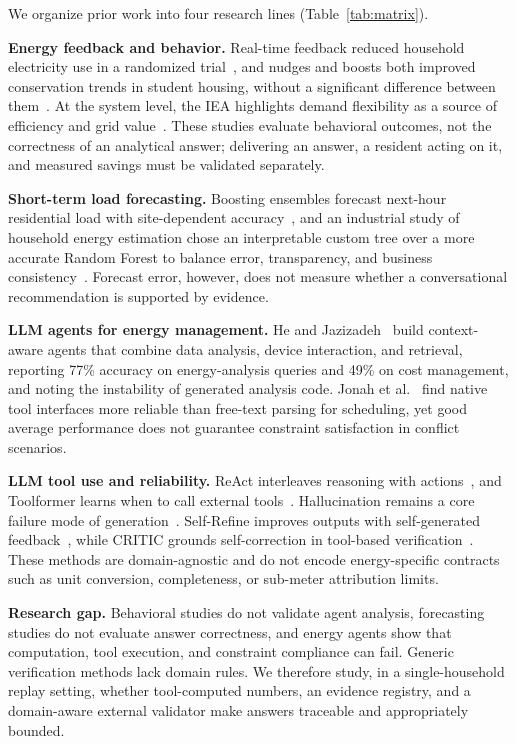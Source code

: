 \documentclass[conference]{IEEEtran}
\begin{document}
We organize prior work into four research lines (Table~\ref{tab:matrix}).

\textbf{Energy feedback and behavior.} Real-time feedback reduced
household electricity use in a randomized trial~\cite{boomsma2025feedback},
and nudges and boosts both improved conservation trends in student
housing, without a significant difference between
them~\cite{paunov2026nudges}. At the system level, the IEA highlights
demand flexibility as a source of efficiency and grid
value~\cite{iea2025flexibility}. These studies evaluate behavioral
outcomes, not the correctness of an analytical answer; delivering an
answer, a resident acting on it, and measured savings must be validated
separately.

\textbf{Short-term load forecasting.} Boosting ensembles forecast
next-hour residential load with site-dependent
accuracy~\cite{muqtadir2025nowcasting}, and an industrial study of
household energy estimation chose an interpretable custom tree over a
more accurate Random Forest to balance error, transparency, and
business consistency~\cite{beraud2024explainable}. Forecast error,
however, does not measure whether a conversational recommendation is
supported by evidence.

\textbf{LLM agents for energy management.} He and
Jazizadeh~\cite{he2025contextaware} build context-aware agents that
combine data analysis, device interaction, and retrieval, reporting
77\% accuracy on energy-analysis queries and 49\% on cost management,
and noting the instability of generated analysis code. Jonah et
al.~\cite{jonah2026agentic} find native tool interfaces more reliable
than free-text parsing for scheduling, yet good average performance
does not guarantee constraint satisfaction in conflict scenarios.

\textbf{LLM tool use and reliability.} ReAct interleaves reasoning
with actions~\cite{yao2023react}, and Toolformer learns when to call
external tools~\cite{schick2023toolformer}. Hallucination remains a
core failure mode of generation~\cite{ji2023hallucination}.
Self-Refine improves outputs with self-generated
feedback~\cite{madaan2023selfrefine}, while CRITIC grounds
self-correction in tool-based verification~\cite{gou2024critic}. These
methods are domain-agnostic and do not encode energy-specific
contracts such as unit conversion, completeness, or sub-meter
attribution limits.

\textbf{Research gap.} Behavioral studies do not validate agent
analysis, forecasting studies do not evaluate answer correctness, and
energy agents show that computation, tool execution, and constraint
compliance can fail. Generic verification methods lack domain rules.
We therefore study, in a single-household replay setting, whether
tool-computed numbers, an evidence registry, and a domain-aware
external validator make answers traceable and appropriately bounded.
\end{document}
